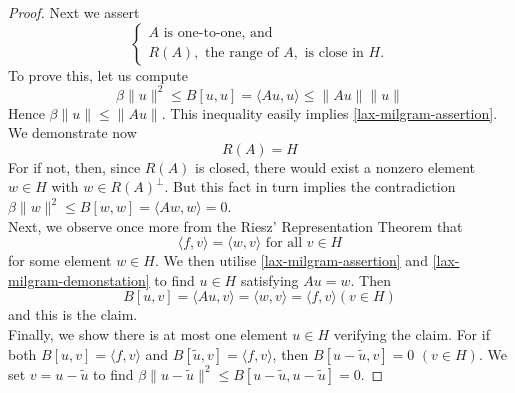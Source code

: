 \begin{theorem}
\begin{proof}
	Next we assert
	\begin{equation}
		\begin{cases} A \text{ is one-to-one, and} \\ R(A), \text{ the range of } A, \text{ is close in } H. \end{cases} \label{lax-milgram-assertion}
	\end{equation} 
	To prove this, let us compute
		\[ \beta \| u \|^{2} \leq B[u, u] = \langle Au, u \rangle \leq \| Au \| \| u \| \]
	Hence $\beta \| u \| \leq \| Au \|$. This inequality easily implies \eqref{lax-milgram-assertion}. \\
	We demonstrate now
		\begin{equation}
			R(A) = H \label{lax-milgram-demonstation}
		\end{equation} 
		For if not, then, since $R(A)$ is closed, there would exist a nonzero element $w \in H$ with $w \in R(A)^{\bot}$. But this fact in turn implies the contradiction $\beta \| w \|^{2} \leq B[w, w] = \langle A w , w \rangle = 0$. \\
	Next, we observe once more from the Riesz' Representation Theorem that
		\[ \langle f, v \rangle = \langle w , v \rangle \text{ for all } v \in H \]
	for some element $w \in H$. We then utilise \eqref{lax-milgram-assertion} and \eqref{lax-milgram-demonstation} to find $u \in H$ satisfying $A u  = w$. Then 
		\[ B[u, v] = \langle A u, v \rangle = \langle w, v \rangle = \langle f, v \rangle (v \in H) \]
	and this is the claim. \\
	
	Finally, we show there is at most one element $u \in H$ verifying the claim. For if both $B[u, v] = \langle f, v \rangle$ and $B[\tilde{u}, v] = \langle f, v \rangle$, then $B[u - \tilde{u}, v] = 0$ $(v \in H)$. We set $v = u - \tilde{u}$ to find $\beta \| u - \tilde{u}\|^{2} \leq B[u - \tilde{u}, u - \tilde{u}] = 0$.
	\end{proof}
\end{theorem}

